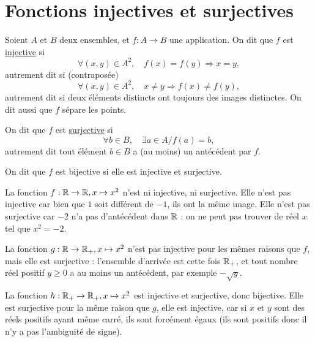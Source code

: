 \section{Fonctions injectives et surjectives}



\begin{definition}Soient $A$ et $B$ deux ensembles, et $f : A \to B$ une application. On dit que $f$ est \underline{injective} si
\[\forall (x,y) \in A^2,\quad f(x)=f(y) \Rightarrow  x=y,\]
autrement dit si (contraposée) 
\[\forall (x,y) \in A^2,\quad x\neq y \Rightarrow  f(x)\neq f(y),\]
autrement dit si deux éléments distincts ont toujours des images distinctes. On dit aussi que $f$ \og sépare les points\fg.\end{definition}
\begin{definition}
On dit que $f$ est \underline{surjective} si
\[\forall b \in B,\quad \exists a\in A / f(a)=b,\]
autrement dit tout élément $b\in B$ a (au moins) un antécédent par $f$.
\end{definition}
\begin{definition}
On dit que $f$ est bijective si elle est injective et surjective.
\end{definition}

\begin{exemple}La fonction $f : \mathbb{R} \to \mathbb{R}, x\mapsto x^2$ n'est ni injective, ni surjective. Elle n'est pas injective car bien que $1$ soit différent de $-1$, ils ont la même image. Elle n'est pas surjective car $-2$ n'a pas d'antécédent dans $\mathbb{R}$ : on ne peut pas trouver de réel $x$ tel que $x^2 = -2$.\end{exemple}

\begin{exemple} La fonction $g : \mathbb{R} \to \mathbb{R}_+, x\mapsto x^2$ n'est pas injective pour les mêmes raisons que $f$, mais elle est surjective : l'ensemble d'arrivée est cette fois $\mathbb{R}_+$, et tout nombre réel positif $y\geq 0$ a au moins un antécédent, par exemple $-\sqrt{y}$.
\end{exemple}

\begin{exemple} La fonction $h : \mathbb{R}_+ \to \mathbb{R}_+, x\mapsto x^2$ est injective et surjective, donc bijective. Elle est surjective pour la même raison que $g$, elle est injective, car si $x$ et $y$ sont des réels positifs ayant même carré, ils sont forcément égaux (ils sont positifs donc il n'y a pas l'ambiguité de signe).
\end{exemple}

